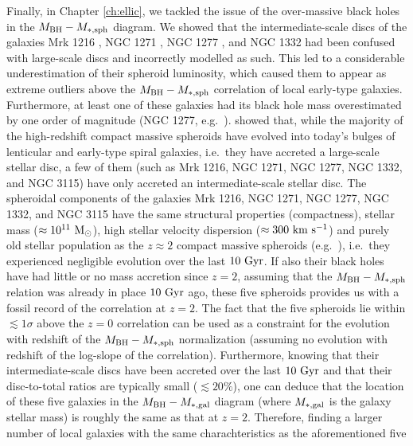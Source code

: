 Finally, in Chapter \ref{ch:ellic}, 
we tackled the issue of the over-massive black holes in the $M_{\rm BH} - M_{\rm *,sph}$ diagram. 
We showed that the intermediate-scale discs of the galaxies Mrk 1216 \citep{yildirim2015}, NGC 1271 \citep{walsh2015}, 
NGC 1277 \citep{vandenbosch2012}, and NGC 1332 \citep{rusli2011} 
had been confused with large-scale discs and incorrectly modelled as such. 
This led to a considerable underestimation of their spheroid luminosity, 
which caused them to appear as extreme outliers above the $M_{\rm BH} - M_{\rm *,sph}$ correlation 
of local early-type galaxies. 
Furthermore, at least one of these galaxies had its black hole mass overestimated by one order of magnitude 
(NGC 1277, e.g.~\citealt{Graham2016n1277}). 
\cite{gds2015} showed that, while the majority of the high-redshift compact massive spheroids 
have evolved into today's bulges of lenticular and early-type spiral galaxies, 
i.e.~they have accreted a large-scale stellar disc, 
a few of them (such as Mrk 1216, NGC 1271, NGC 1277, NGC 1332, and NGC 3115) 
have only accreted an intermediate-scale stellar disc. 
The spheroidal components of the galaxies Mrk 1216, NGC 1271, NGC 1277, NGC 1332, and NGC 3115 
have the same structural properties (compactness), stellar mass ($\approx 10^{11} \rm~M_\odot$), 
high stellar velocity dispersion ($\approx 300 \rm~km~s^{-1}$) and purely old stellar population 
as the $z \approx 2$ compact massive spheroids (e.g.~\citealt{daddi2005,trujillo2006,vandokkum2008,damjanov2009}), 
i.e.~they experienced negligible evolution over the last $10 \rm~Gyr$. 
If also their black holes have had little or no mass accretion since $z = 2$, 
assuming that the $M_{\rm BH} - M_{\rm *,sph}$ relation was already in place $10 \rm~Gyr$ ago, 
these five spheroids provides us with a fossil record of the correlation at $z=2$. 
The fact that the five spheroids lie within $\lesssim 1\sigma$ above the $z=0$ correlation 
can be used as a constraint for the evolution with redshift of the $M_{\rm BH} - M_{\rm *,sph}$ normalization 
(assuming no evolution with redshift of the log-slope of the correlation). 
Furthermore, knowing that their intermediate-scale discs have been accreted over the last $10 \rm~Gyr$ 
and that their disc-to-total ratios are typically small ($\lesssim 20\%$), 
one can deduce that the location of these five galaxies in the $M_{\rm BH} - M_{\rm *,gal}$ diagram 
(where $M_{\rm *,gal}$ is the galaxy stellar mass) 
is roughly the same as that at $z=2$. 
Therefore, finding a larger number of local galaxies with the same charachteristics as the aforementioned five 
